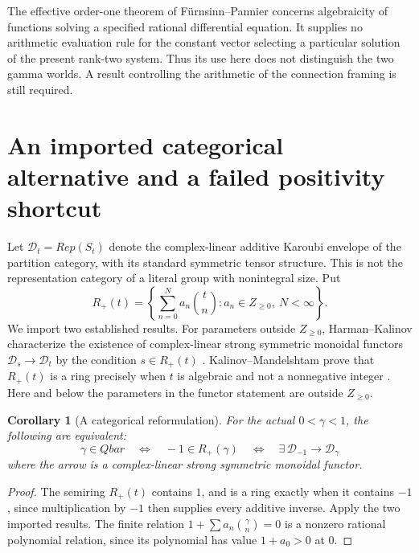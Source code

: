 \documentclass[11pt,a4paper]{article}
\newcommand{\Z}{\mathbb Z}
\newcommand{\QB}{\overline{\mathbb Q}}
\newcommand{\Qbar}{\overline{\mathbb Q}}
\newtheorem{corollary}[theorem]{Corollary}
\theoremstyle{definition}
\theoremstyle{remark}
\theoremstyle{plain}
\numberwithin{equation}{section}
\def\Qbar{Qbar}\def\QB{Qbar}\def\mathbb#1{#1}%
\def\operatorname#1{#1}\def\mathrm#1{#1}}
\begin{document}
The effective order-one theorem of F\"urnsinn--Pannier
\cite[Theorem~1.3]{FP} concerns algebraicity of functions
solving a specified rational differential equation. It supplies no
arithmetic evaluation rule for the constant vector selecting a
particular solution of the present rank-two system. Thus its use here
does not distinguish the two gamma worlds. A result controlling the
arithmetic of the connection framing is still required.

\section{An imported categorical alternative and a failed positivity shortcut}

Let $\mathcal D_t=\operatorname{Rep}(S_t)$ denote the complex-linear
additive Karoubi envelope of the partition category, with its standard
symmetric tensor structure. This is not the representation category
of a literal group with nonintegral size. Put
\[
 R_+(t)=\left\{\sum_{n=0}^N a_n\binom tn:
                a_n\in\Z_{\ge0},\ N<\infty\right\}.
\]
We import two established results. For parameters outside $\Z_{\ge0}$,
Harman--Kalinov characterize the existence of complex-linear strong
symmetric monoidal functors $\mathcal D_s\to\mathcal D_t$ by the
condition $s\in R_+(t)$ \cite[Corollary 3.2.4]{HK}. Kalinov--Mandelshtam prove that $R_+(t)$
is a ring precisely when $t$ is algebraic and not a nonnegative integer
\cite[Theorem 1.3]{KM}. Here and below the parameters in the functor
statement are outside $\Z_{\ge0}$.

\begin{corollary}[A categorical reformulation]
For the actual $0<\gamma<1$, the following are equivalent:
\[
 \gamma\in\Qbar
 \quad\Longleftrightarrow\quad -1\in R_+(\gamma)
 \quad\Longleftrightarrow\quad
 \exists\,\mathcal D_{-1}\longrightarrow\mathcal D_\gamma
\]
where the arrow is a complex-linear strong symmetric monoidal functor.
\end{corollary}
\begin{proof}
The semiring $R_+(t)$ contains $1$, and is a ring exactly when it
contains $-1$, since multiplication by $-1$ then supplies every
additive inverse. Apply the two imported results. The finite relation
$1+\sum a_n\binom\gamma n=0$ is a nonzero rational polynomial
relation, since its polynomial has value $1+a_0>0$ at $0$.
\end{proof}
\end{document}
